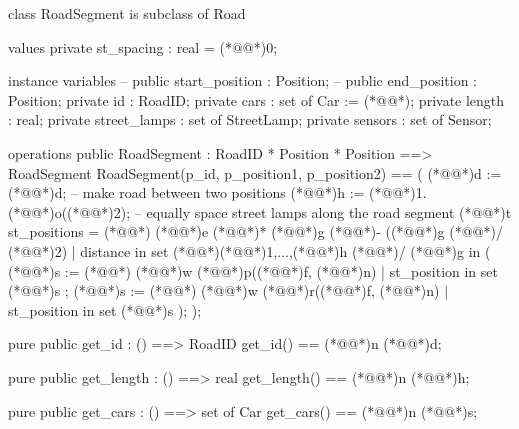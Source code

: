 \documentclass[a4paper]{article}
\begin{document}
\title{}
\author{}
\begin{vdm_al}
class RoadSegment is subclass of Road

values
    private st_spacing : real = (*@@*)0;

instance variables
    -- public start_position : Position;
    -- public end_position : Position;
    private id : RoadID;
    private cars : set of Car := (*@\vdmnotcovered{}@*){};
    private length : real;
    private street_lamps : set of StreetLamp;
    private sensors : set of Sensor;

operations
    public RoadSegment : RoadID * Position * Position ==> RoadSegment
    RoadSegment(p_id, p_position1, p_position2) == (
        (*@@*)d := (*@@*)d;
        -- make road between two positions
        (*@@*)h := (*@@*)1.(*@@*)o((*@@*)2);
        -- equally space street lamps along the road segment
        (*@@*)t st_positions = (*@\vdmnotcovered{}@*){
            (*@@*)e (*@\vdmnotcovered{}@*)* (*@@*)g (*@\vdmnotcovered{}@*)- ((*@@*)g (*@\vdmnotcovered{}@*)/ (*@\vdmnotcovered{}@*)2)
            | distance in set (*@\vdmnotcovered{}@*){(*@\vdmnotcovered{}@*)1,...,(*@@*)h (*@\vdmnotcovered{}@*)/ (*@@*)g}
        } in (
            (*@@*)s := (*@\vdmnotcovered{}@*){
                (*@@*)w (*@@*)p((*@@*)f, (*@@*)n)
                | st_position in set (*@@*)s
            };
            (*@@*)s := (*@\vdmnotcovered{}@*){
                (*@@*)w (*@@*)r((*@@*)f, (*@@*)n)
                | st_position in set (*@@*)s
            }
        );
    );

    pure public get_id : () ==> RoadID
    get_id() == (*@@*)n (*@@*)d;

    pure public get_length : () ==> real
    get_length() == (*@@*)n (*@@*)h;

    pure public get_cars : () ==> set of Car
    get_cars() == (*@@*)n (*@@*)s;


\end{vdm_al}
\end{document}
